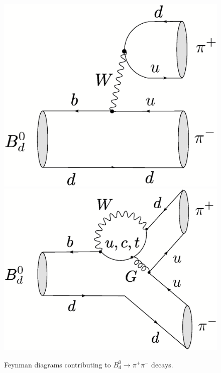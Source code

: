 \documentclass[11pt]{cernrep}
\begin{document}
\begin{figure}
\centerline{
 \includegraphics[width=4.5truecm]{B0dtopipi-tree.ps}
 \hspace*{0.5truecm}
 \includegraphics[width=5.2truecm]{B0dtopipi-pen.ps}  
 }
 \vspace*{-0.3truecm}
\caption{Feynman diagrams contributing to $B^0_d\to \pi^+\pi^-$ 
decays.}\label{fig:Bpipi-diag}
\end{figure}
\end{document}

